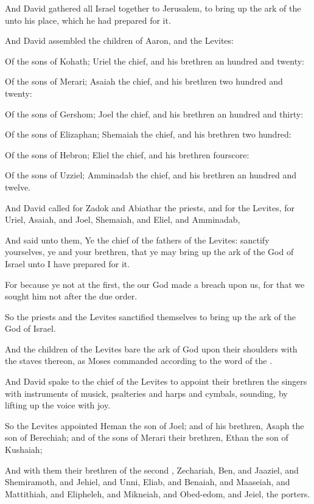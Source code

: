 {And
David
gathered all
Israel
together to
Jerusalem, to bring
up the
ark of the
{} unto his
place, which he had
prepared for it.

And
David
assembled the
children of
Aaron, and the
Levites:

Of the
sons of
Kohath;
Uriel the
chief, and his
brethren an
hundred and
twenty:

Of the
sons of
Merari;
Asaiah the
chief, and his
brethren two
hundred and
twenty:

Of the
sons of
Gershom;
Joel the
chief, and his
brethren an
hundred and
thirty:

Of the
sons of
Elizaphan;
Shemaiah the
chief, and his
brethren two
hundred:

Of the
sons of
Hebron;
Eliel the
chief, and his
brethren
fourscore:

Of the
sons of
Uzziel;
Amminadab the
chief, and his
brethren an
hundred and
twelve.

And
David
called for
Zadok and
Abiathar the
priests, and for the
Levites, for
Uriel,
Asaiah, and
Joel,
Shemaiah, and
Eliel, and
Amminadab,

And
said unto them, Ye
{} the
chief of the
fathers of the
Levites:
sanctify yourselves,
{} ye and your
brethren, that ye may bring
up the
ark of the
{}
God of
Israel unto
{} I have
prepared for it.

For because ye
{} not at the
first, the
{} our
God made a
breach upon us, for that we
sought him not after the due
order.

So the
priests and the
Levites
sanctified themselves to bring
up the
ark of the
{}
God of
Israel.

And the
children of the
Levites
bare the
ark of
God upon their
shoulders with the
staves thereon, as
Moses
commanded according to the
word of the
{}.

And
David
spake to the
chief of the
Levites to
appoint their
brethren
{} the
singers with
instruments of
musick,
psalteries and
harps and
cymbals,
sounding, by lifting
up the
voice with
joy.

So the
Levites
appointed
Heman the
son of
Joel; and of his
brethren,
Asaph the
son of
Berechiah; and of the
sons of
Merari their
brethren,
Ethan the
son of
Kushaiah;

And with them their
brethren of the
second
{},
Zechariah,
Ben, and
Jaaziel, and
Shemiramoth, and
Jehiel, and
Unni,
Eliab, and
Benaiah, and
Maaseiah, and
Mattithiah, and
Elipheleh, and
Mikneiah, and
Obed-edom, and
Jeiel, the
porters.

}
